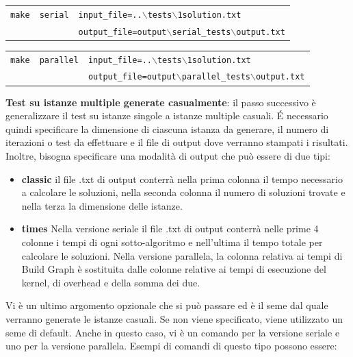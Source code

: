 \documentclass[12pt]{article}
\begin{document}
    \begin{table}[h]
    \begin{tabular}{lll}
        \texttt{make} & \texttt{serial} & \texttt{input\_file=..$\backslash$tests$\backslash$1solution.txt} \\ 
        & & \texttt{output\_file=output$\backslash$serial\_tests$\backslash$output.txt} \\
        \end{tabular}
    \end{table}

    \begin{table}[h]
    \begin{tabular}{lll}
        \texttt{make} & \texttt{parallel} & \texttt{input\_file=..$\backslash$tests$\backslash$1solution.txt} \\ 
        & & \texttt{output\_file=output$\backslash$parallel\_tests$\backslash$output.txt} \\
        \end{tabular}
    \end{table}

    \textbf{Test su istanze multiple generate casualmente}: il passo successivo è generalizzare il test su istanze singole a istanze multiple casuali. \'E necessario quindi specificare la dimensione di ciascuna istanza da generare, il numero di iterazioni o test da effettuare e il file di output dove verranno stampati i risultati. Inoltre, bisogna specificare una modalità di output che può essere di due tipi: 
    
    \begin{itemize}
        \item \textbf{classic} il file .txt di output conterrà nella prima colonna il tempo necessario a calcolare le soluzioni, nella seconda colonna il numero di soluzioni trovate e nella terza la dimensione delle istanze.
        \item \textbf{times} Nella versione seriale il file .txt di output conterrà nelle prime 4 colonne i tempi di ogni sotto-algoritmo e nell'ultima il tempo totale per calcolare le soluzioni. Nella versione parallela, la colonna relativa ai tempi di Build Graph è sostituita dalle colonne relative ai tempi di esecuzione del kernel, di overhead e della somma dei due.
    \end{itemize}
    
    Vi è un ultimo argomento opzionale che si può passare ed è il seme dal quale verranno generate le istanze casuali. Se non viene specificato, viene utilizzato un seme di default. Anche in questo caso, vi è un comando per la versione seriale e uno per la versione parallela. Esempi di comandi di questo tipo possono essere:
\end{document}
